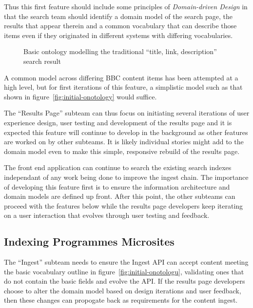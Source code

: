 Thus this first feature should include some principles of
\emph{Domain-driven Design}\cite{evans2004domain}
in that the search team should identify
a domain model of the search page, the results that appear therein
and a common vocabulary that can describe those items even if
they originated in different systems with differing vocabularies.

\begin{figure}
  \begin{center}
    \begin{dot2tex}[dot,pgf,scale=0.41]
      
    \end{dot2tex}
  \end{center}
  \caption{Basic ontology modelling the traditional ``title, link, description'' search result}
  \label{fig:initial-ontology}
\end{figure}

A common model across differing BBC content items has been
attempted\cite{fenning2014applicability} at a high level, but
for first iterations of this feature, a simplistic model
such as that shown in figure~\ref{fig:initial-onotology}
would suffice.

The ``Results Page'' subteam can thus focus on initiating
several iterations of user experience design, user testing
and development of the results page and it is expected this
feature will continue to develop in the background as
other features are worked on by other subteams. It is likely
individual stories might add to the domain model even
to make this simple, responsive rebuild of the results page.

The front end application can continue to search the
existing search indexes independant of any work being done
to improve the ingest chain. The importance of developing
this feature first is to ensure the information architecture
and domain models are defined up front. After this point,
the other subteams can proceed with the features below
while the results page developers keep iterating on
a user interaction that evolves through user testing and
feedback.

\subsection{Indexing Programmes Microsites}

The ``Ingest'' subteam needs to ensure the Ingest API can
accept content meeting the basic vocabulary outline in
figure~\ref{fig:initial-onotologu}, validating ones
that do not contain the basic fields and evolve the API. If
the results page developers choose to alter the domain
model based on design iterations and user feedback, then
these changes can propogate back as requirements for the
content ingest.

